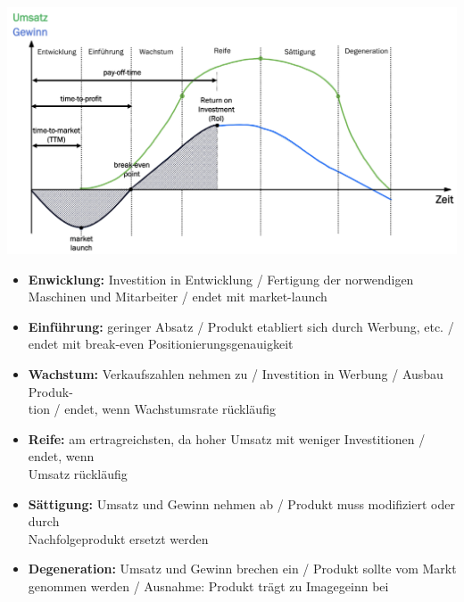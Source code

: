 \begin{scriptsize}
    \begin{center}
        \includegraphics[width = 0.9\linewidth]{MAEIP_Produktlebenszyklus}
    \end{center}
    \begin{itemize}
        \item \textbf{Enwicklung:} Investition in Entwicklung / Fertigung der norwendigen Maschinen und Mitarbeiter / endet mit market-launch
        \item \textbf{Einführung:} geringer Absatz / Produkt etabliert sich durch Werbung, etc. / endet mit break-even Positionierungsgenauigkeit
        \item \textbf{Wachstum:} Verkaufszahlen nehmen zu / Investition in Werbung / Ausbau Produk-\\tion / endet, wenn Wachstumsrate rückläufig
        \item \textbf{Reife:} am ertragreichsten, da hoher Umsatz mit weniger Investitionen / endet, wenn \\Umsatz rückläufig
        \item \textbf{Sättigung:} Umsatz und Gewinn nehmen ab / Produkt muss modifiziert oder durch \\Nachfolgeprodukt ersetzt werden
        \item \textbf{Degeneration:} Umsatz und Gewinn brechen ein / Produkt sollte vom Markt \\genommen werden / Ausnahme: Produkt trägt zu Imagegeinn bei
    \end{itemize}
\end{scriptsize}